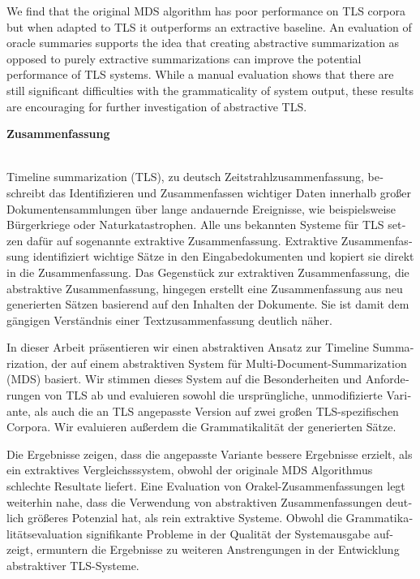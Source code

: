 \documentclass[a4paper,BCOR=10mm]{report}
\numberwithin{lemma}{chapter}
\numberwithin{definition}{chapter}
\begin{document}
\begin{titlepage}
We find that the original MDS algorithm has poor performance on TLS corpora but when adapted to TLS it outperforms an extractive baseline.
An evaluation of oracle summaries supports the idea that creating abstractive summarization as opposed to purely extractive summarizations can improve the potential performance of TLS systems.
While a manual evaluation shows that there are still significant difficulties with the grammaticality of system output, these results are encouraging for further investigation of abstractive TLS.

\newpage
\noindent
\large\textbf{Zusammenfassung}\\
\\

\begin{otherlanguage}{german}

Timeline summarization (TLS), zu deutsch Zeitstrahlzusammenfassung, beschreibt das Identifizieren und Zusammenfassen wichtiger Daten innerhalb großer Dokumentensammlungen über lange andauernde Ereignisse, wie beispielsweise Bürgerkriege oder Naturkatastrophen.
Alle uns bekannten Systeme für TLS setzen dafür auf sogenannte extraktive Zusammenfassung. Extraktive Zusammenfassung identifiziert wichtige Sätze in den Eingabedokumenten und kopiert sie direkt in die Zusammenfassung. Das Gegenstück zur extraktiven Zusammenfassung, die abstraktive Zusammenfassung, hingegen erstellt eine Zusammenfassung aus neu generierten Sätzen basierend auf den Inhalten der Dokumente. Sie ist damit dem gängigen Verständnis einer Textzusammenfassung deutlich näher.

In dieser Arbeit präsentieren wir einen abstraktiven Ansatz zur Timeline Summarization, der auf einem abstraktiven System für Multi-Document-Summarization (MDS) basiert. Wir stimmen dieses System auf die Besonderheiten und Anforderungen von TLS ab und evaluieren sowohl die ursprüngliche, unmodifizierte Variante, als auch die an TLS angepasste Version auf zwei großen TLS-spezifischen Corpora.
Wir evaluieren außerdem die Grammatikalität der generierten Sätze.

Die Ergebnisse zeigen, dass die angepasste Variante bessere Ergebnisse erzielt, als ein extraktives Vergleichsssystem, obwohl der originale MDS Algorithmus schlechte Resultate liefert.
Eine Evaluation von Orakel-Zusammenfassungen legt weiterhin nahe, dass die Verwendung von abstraktiven Zusammenfassungen deutlich größeres Potenzial hat, als rein extraktive Systeme.
Obwohl die Grammatikalitätsevaluation signifikante Probleme in der Qualität der Systemausgabe aufzeigt, ermuntern die Ergebnisse zu weiteren Anstrengungen in der Entwicklung abstraktiver TLS-Systeme. 
\end{otherlanguage}


\newpage
\normalsize
\tableofcontents

\end{titlepage}
\end{document}
